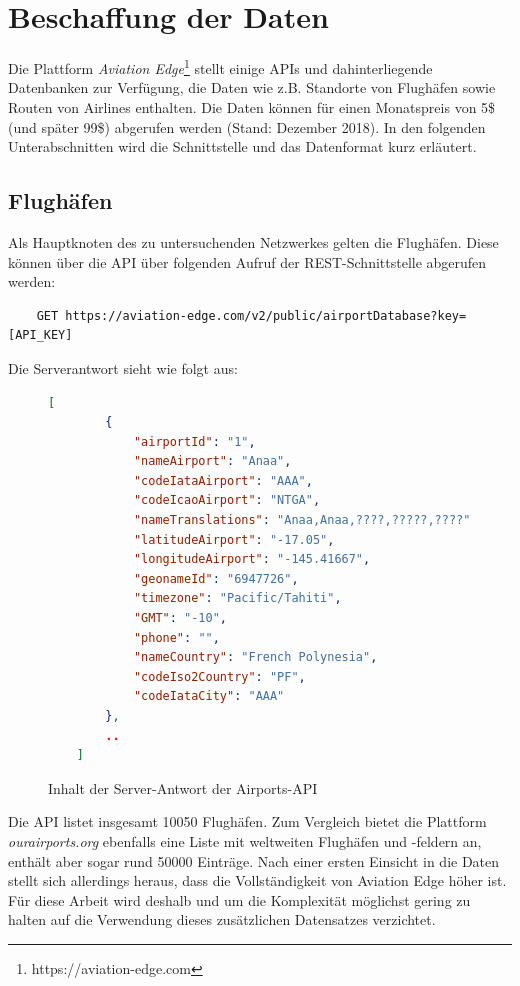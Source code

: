 \section{Beschaffung der Daten}
\label{sec:data-mining}

Die Plattform \textit{Aviation Edge}\footnote{https://aviation-edge.com} stellt einige APIs und dahinterliegende Datenbanken
zur Verfügung, die Daten wie z.B. Standorte von Flughäfen sowie Routen von Airlines enthalten.
Die Daten können für einen Monatspreis von 5\$ (und später 99\$) abgerufen werden (Stand: Dezember 2018).
In den folgenden Unterabschnitten wird die Schnittstelle und das Datenformat kurz erläutert.

\subsection{Flughäfen}
\label{sec:airports}

Als Hauptknoten des zu untersuchenden Netzwerkes gelten die Flughäfen.
Diese können über die API über folgenden Aufruf der REST-Schnittstelle abgerufen werden:
\begin{lstlisting}
    GET https://aviation-edge.com/v2/public/airportDatabase?key=[API_KEY]
\end{lstlisting}
Die Serverantwort sieht wie folgt aus:

\begin{figure}[ht]
    \centering
    \begin{lstlisting}[language=json]
    [
        {
            "airportId": "1",
            "nameAirport": "Anaa",
            "codeIataAirport": "AAA",
            "codeIcaoAirport": "NTGA",
            "nameTranslations": "Anaa,Anaa,????,?????,????",
            "latitudeAirport": "-17.05",
            "longitudeAirport": "-145.41667",
            "geonameId": "6947726",
            "timezone": "Pacific/Tahiti",
            "GMT": "-10",
            "phone": "",
            "nameCountry": "French Polynesia",
            "codeIso2Country": "PF",
            "codeIataCity": "AAA"
        },
        ..
    ]

    \end{lstlisting}
    \caption{Inhalt der Server-Antwort der Airports-API}
    \label{lst:AirportsAPIResponse}
\end{figure}

Die API listet insgesamt 10050 Flughäfen.
Zum Vergleich bietet die Plattform \textit{ourairports.org} ebenfalls eine Liste mit weltweiten Flughäfen und -feldern an, enthält aber sogar
rund 50000 Einträge.
Nach einer ersten Einsicht in die Daten stellt sich allerdings heraus, dass die Vollständigkeit von Aviation Edge höher ist.
Für diese Arbeit wird deshalb und um die Komplexität möglichst gering zu halten auf die Verwendung dieses zusätzlichen Datensatzes verzichtet.


